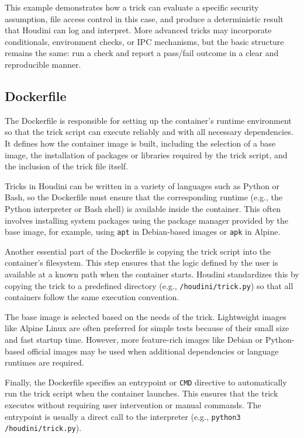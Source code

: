 \documentclass[12pt]{report}
\begin{document}
\begin{doublespace}
This example demonstrates how a trick can evaluate a specific security assumption, file access control in this case, and produce a deterministic result that Houdini can log and interpret. More advanced tricks may incorporate conditionals, environment checks, or IPC mechanisms, but the basic structure remains the same: run a check and report a pass/fail outcome in a clear and reproducible manner.



\subsection{Dockerfile}

The Dockerfile is responsible for setting up the container's runtime environment so that the trick script can execute reliably and with all necessary dependencies. It defines how the container image is built, including the selection of a base image, the installation of packages or libraries required by the trick script, and the inclusion of the trick file itself.

Tricks in Houdini can be written in a variety of languages such as Python or Bash, so the Dockerfile must ensure that the corresponding runtime (e.g., the Python interpreter or Bash shell) is available inside the container. This often involves installing system packages using the package manager provided by the base image, for example, using \texttt{apt} in Debian-based images or \texttt{apk} in Alpine.

Another essential part of the Dockerfile is copying the trick script into the container's filesystem. This step ensures that the logic defined by the user is available at a known path when the container starts. Houdini standardizes this by copying the trick to a predefined directory (e.g., \texttt{/houdini/trick.py}) so that all containers follow the same execution convention.

The base image is selected based on the needs of the trick. Lightweight images like Alpine Linux are often preferred for simple tests because of their small size and fast startup time. However, more feature-rich images like Debian or Python-based official images may be used when additional dependencies or language runtimes are required.

Finally, the Dockerfile specifies an entrypoint or \texttt{CMD} directive to automatically run the trick script when the container launches. This ensures that the trick executes without requiring user intervention or manual commands. The entrypoint is usually a direct call to the interpreter (e.g., \texttt{python3 /houdini/trick.py}).


\end{doublespace}
\end{document}
